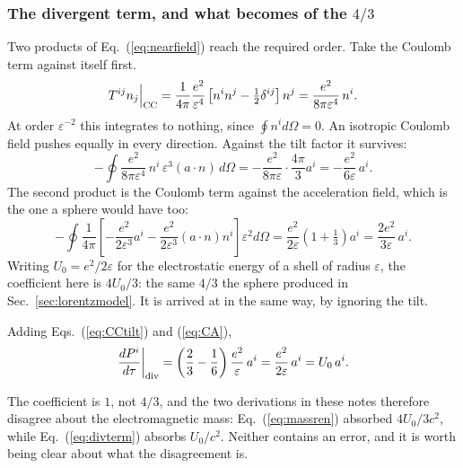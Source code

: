 \documentclass[preprint]{aastex701}
\begin{document}
\subsubsection{The divergent term, and what becomes of the $4/3$}
\label{sec:fourthirds}



Two products of Eq.~(\ref{eq:nearfield}) reach the required order. Take the
Coulomb term against itself first.
\begin{equation}
T^{ij}n_j\Big|_{\rm CC}
= \frac{1}{4\pi}\frac{e^2}{\varepsilon^4}
\left[n^in^j - \tfrac12\delta^{ij}\right]n^j
= \frac{e^2}{8\pi\varepsilon^4}\,n^i .
\label{eq:CC}
\end{equation}
At order $\varepsilon^{-2}$ this integrates to nothing, since
$\oint n^i d\Omega = 0$. An isotropic Coulomb field pushes equally in every
direction. Against the tilt factor it survives:
\begin{equation}
-\oint \frac{e^2}{8\pi\varepsilon^4}\,n^i\,
\varepsilon^3(a\cdot n)\,d\Omega
= -\frac{e^2}{8\pi\varepsilon}\cdot\frac{4\pi}{3}a^i
= -\frac{e^2}{6\varepsilon}\,a^i .
\label{eq:CCtilt}
\end{equation}
The second product is the Coulomb term against the acceleration field, which is
the one a sphere would have too:
\begin{equation}
-\oint\frac{1}{4\pi}
\left[-\frac{e^2}{2\varepsilon^3}a^i
-\frac{e^2}{2\varepsilon^3}(a\cdot n)n^i\right]\varepsilon^2 d\Omega
= \frac{e^2}{2\varepsilon}\left(1+\tfrac13\right)a^i
= \frac{2e^2}{3\varepsilon}\,a^i .
\label{eq:CA}
\end{equation}
Writing $U_0 = e^2/2\varepsilon$ for the electrostatic energy of a shell of
radius $\varepsilon$, the coefficient here is $4U_0/3$: the same $4/3$ the
sphere produced in Sec.~\ref{sec:lorentzmodel}. It is arrived at in the same
way, by ignoring the tilt.

Adding Eqs.~(\ref{eq:CCtilt}) and (\ref{eq:CA}),
\begin{equation}
\frac{dP^i}{d\tau}\bigg|_{\rm div}
= \left(\frac{2}{3}-\frac{1}{6}\right)\frac{e^2}{\varepsilon}\,a^i
= \frac{e^2}{2\varepsilon}\,a^i = U_0\,a^i .
\label{eq:divterm}
\end{equation}

The coefficient is $1$, not $4/3$, and the two derivations in these notes
therefore disagree about the electromagnetic mass:
Eq.~(\ref{eq:massren}) absorbed $4U_0/3c^2$, while Eq.~(\ref{eq:divterm})
absorbs $U_0/c^2$. Neither contains an error, and it is worth being clear about
what the disagreement is.
\end{document}
